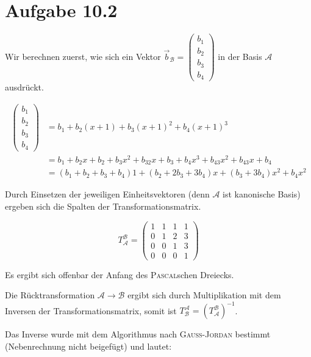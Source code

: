 \documentclass[a4paper,german,12pt,smallheadings]{scrartcl}
\begin{document}
\section*{Aufgabe 10.2}

Wir berechnen zuerst, wie sich ein Vektor $\vec{b}_{\mathcal{B}}  = \begin{pmatrix} b_1 \\ b_2
\\ b_3 \\ b_4 \end{pmatrix}$ in der Basis $\mathcal{A}$ ausdrückt.

\begin{align*}
  \begin{pmatrix} b_1 \\ b_2\\ b_3 \\ b_4 \end{pmatrix} &= b_1 + b_2(x+1) + b_3(x+1)^2 + b_4(x+1)^3 \\
                                                        &= b_1 + b_2x + b_2 + b_3x^2 + b_32x + b_3 + b_4x^3 + b_43x^2 + b_43x + b_4 \\
                                                        &= (b_1 + b_2 + b_3 + b_4)1 + (b_2 + 2b_3 + 3b_4)x + (b_3 + 3b_4)x^2 + b_4x^2
\end{align*}

Durch Einsetzen der jeweiligen Einheitsvektoren (denn $\mathcal{A}$ ist
kanonische Basis) ergeben sich die Spalten der Transformationsmatrix.

\begin{equation}
  T_{\mathcal{A}}^{\mathcal{B}} = \begin{pmatrix} 1 & 1 & 1 & 1 \\ 0 & 1 & 2 & 3 \\ 0 & 0 & 1 & 3 \\ 0 & 0 & 0 & 1\end{pmatrix}
\end{equation}

Es ergibt sich offenbar der Anfang des \textsc{Pascal}schen Dreiecks.

Die Rücktransformation $\mathcal{A} \to \mathcal{B}$ ergibt sich durch
Multiplikation mit dem Inversen der Transformationsmatrix, somit ist
$T_{\mathcal{B}}^{\mathcal{A}} =
\left(T_{\mathcal{A}}^{\mathcal{B}}\right)^{-1}$.

Das Inverse wurde mit dem Algorithmus nach \textsc{Gauß-Jordan} bestimmt
(Nebenrechnung nicht beigefügt) und lautet:
\end{document}
